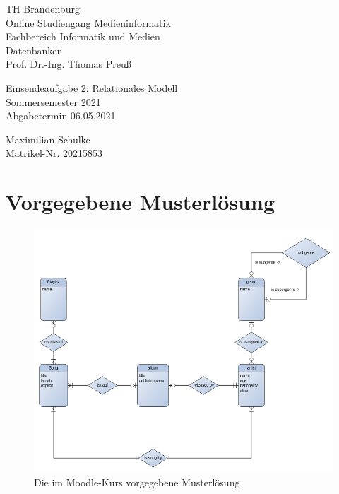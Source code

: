 \documentclass{article}
\begin{document}
\begin{titlepage}
	\begin{flushleft}
		TH Brandenburg \\
		Online Studiengang Medieninformatik \\
		Fachbereich Informatik und Medien \\
		Datenbanken \\
		Prof. Dr.-Ing. Thomas Preuß
	\end{flushleft}

	\vfill

	\begin{center}
		\Large{Einsendeaufgabe 2: Relationales Modell}\\[0.5em]
		\large{Sommersemester 2021}\\[0.25em]
		\large{Abgabetermin 06.05.2021}
	\end{center}

	\vfill

	\begin{flushright}
		Maximilian Schulke \\
		Matrikel-Nr. 20215853
	\end{flushright}
\end{titlepage}

\newpage

\section{Vorgegebene Musterlösung}

\begin{figure}[h!]
	\includegraphics[width=\textwidth]{er.jpg}
	\centering
	\caption{Die im Moodle-Kurs vorgegebene Musterlösung}
\end{figure}
\end{document}
